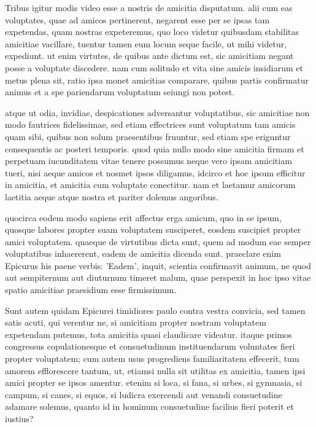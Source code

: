  Tribus igitur modis video esse a nostris de amicitia disputatum. alii cum eas voluptates, quae ad amicos pertinerent, negarent esse per se ipsas tam expetendas, quam nostras expeteremus, quo loco videtur quibusdam stabilitas amicitiae vacillare, tuentur tamen eum locum seque facile, ut mihi videtur, expediunt. ut enim virtutes, de quibus ante dictum est, sic amicitiam negant posse a voluptate discedere. nam cum solitudo et vita sine amicis insidiarum et metus plena sit, ratio ipsa monet amicitias comparare, quibus partis confirmatur animus et a spe pariendarum voluptatum seiungi non potest.

 atque ut odia, invidiae, despicationes adversantur voluptatibus, sic amicitiae non modo fautrices fidelissimae, sed etiam effectrices sunt voluptatum tam amicis quam sibi, quibus non solum praesentibus fruuntur, sed etiam spe eriguntur consequentis ac posteri temporis. quod quia nullo modo sine amicitia firmam et perpetuam iucunditatem vitae tenere possumus neque vero ipsam amicitiam tueri, nisi aeque amicos et nosmet ipsos diligamus, idcirco et hoc ipsum efficitur in amicitia, et amicitia cum voluptate conectitur. nam et laetamur amicorum laetitia aeque atque nostra et pariter dolemus angoribus.

 quocirca eodem modo sapiens erit affectus erga amicum, quo in se ipsum, quosque labores propter suam voluptatem susciperet, eosdem suscipiet propter amici voluptatem. quaeque de virtutibus dicta sunt, quem ad modum eae semper voluptatibus inhaererent, eadem de amicitia dicenda sunt. praeclare enim Epicurus his paene verbis: 'Eadem', inquit, scientia confirmavit animum, ne quod aut sempiternum aut diuturnum timeret malum, quae perspexit in hoc ipso vitae spatio amicitiae praesidium esse firmissimum.

 Sunt autem quidam Epicurei timidiores paulo contra vestra convicia, sed tamen satis acuti, qui verentur ne, si amicitiam propter nostram voluptatem expetendam putemus, tota amicitia quasi claudicare videatur. itaque primos congressus copulationesque et consuetudinum instituendarum voluntates fieri propter voluptatem; cum autem usus progrediens familiaritatem effecerit, tum amorem efflorescere tantum, ut, etiamsi nulla sit utilitas ex amicitia, tamen ipsi amici propter se ipsos amentur. etenim si loca, si fana, si urbes, si gymnasia, si campum, si canes, si equos, si ludicra exercendi aut venandi consuetudine adamare solemus, quanto id in hominum consuetudine facilius fieri poterit et iustius?


